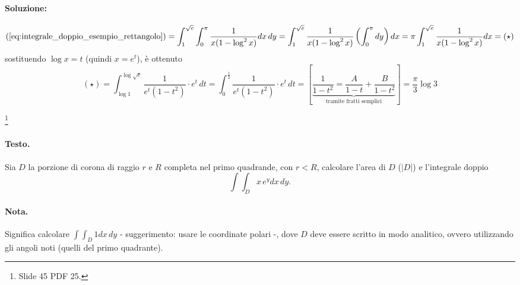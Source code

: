 \begin{example}
	\paragraph{Soluzione:}
	\begin{equation*}
		(\ref{eq:integrale_doppio_esempio_rettangolo}) = \int_1^{\sqrt{e}}\int_0^{\pi}\frac{1}{x(1-\log^2x)} dx\, dy = \int_1^{\sqrt{e}} \frac{1}{x(1-\log^2x)} \left(\int_0^{\pi}dy\right)dx = \pi \int_1^{\sqrt{e}} \frac{1}{x(1-\log^2x)}  dx = (\star)
	\end{equation*}
	sostituendo $\log x = t$ (quindi $x=e^t$), è ottenuto
	\begin{equation*}
		(\star) = \int_{\log 1}^{\log\sqrt{e}} \frac{1}{e^t(1-t^2)} \cdot e^t\, dt = \int_0^{\frac{1}{2}} \frac{1}{e^t(1-t^2)} \cdot e^t\, dt = \left[\underbrace{\frac{1}{1-t^2} = \frac{A}{1-t} + \frac{B}{1-t^2}}_{\text{tramite fratti semplici}}\right] = \frac{\pi}{3}\log 3
	\end{equation*}
\end{example}

\begin{exercise}\footnote{Slide 45 PDF 25.}
	\paragraph{Testo.} Sia $D$ la porzione di corona di raggio $r$ e $R$ completa nel primo quadrande, con $r < R$, calcolare l'area di $D$ ($|D|$) e l'integrale doppio
	\begin{equation*}
		\int\int_D x\, e^y dx\, dy.
	\end{equation*}
	\paragraph{Nota.} Significa calcolare $\int\int_D 1 dx\, dy$ - suggerimento: usare le coordinate polari -, dove $D$ deve essere scritto in modo analitico, ovvero utilizzando gli angoli noti (quelli del primo quadrante).
\end{exercise}

